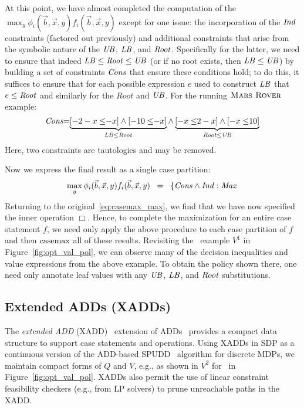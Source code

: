 At this point, we have almost completed the computation
of the $\max_y \phi_i(\vec{b},\vec{x},y) f_i(\vec{b},\vec{x},y)$
except for one issue: the incorporation of the $\mathit{Ind}$ constraints
(factored out previously) and additional constraints that arise from the
symbolic nature of the $\mathit{UB}$, $\mathit{LB}$, and $\mathit{Root}$.  Specifically
for the latter, we need to ensure that indeed $\mathit{LB} \leq \mathit{Root} \leq \mathit{UB}$
(or if no root exists, then $\mathit{LB} \leq \mathit{UB}$) by building a set
of constraints $\mathit{Cons}$ that ensure these conditions hold; to do this,
it suffices to ensure that for each possible expression $e$ used to
construct $\mathit{LB}$ that $e \leq \mathit{Root}$ and similarly for the $Root$ and $\mathit{UB}$.
For the running $\textsc{Mars Rover}$ example:
{\footnotesize 
\begin{equation*}
\mathit{Cons} \hspace{-1mm} = \hspace{-1mm} \underbrace{[-2 - x \leq \hspace{-1mm} -x] \land [-10 \leq \hspace{-1mm} -x]}_{\mathit{LB} \leq \mathit{Root}} \land \underbrace{[-x \leq \hspace{-1mm} 2 - x] \land [-x \leq \hspace{-1mm} 10]}_{\mathit{Root} \leq \mathit{UB}} 
\end{equation*}}
Here, two constraints are tautologies and may be removed.

Now we express the final result as a single case partition:
\begin{equation*}
\max_y \phi_i(\vec{b},\vec{x},y) f_i(\vec{b},\vec{x},y) \;\; = \;\;
\left\{ \mathit{Cons} \land \mathit{Ind}: \mathit{Max} \right.
\end{equation*}
Returning to the original~\eqref{eq:casemax_max}, we find that we have
now specified the inner operation $\Box$.  Hence, to complete the
maximization for an entire case statement $f$, we need only apply the
above procedure to each case partition of $f$ and then $\mathrm{casemax}$ all
of these results.  Revisiting the \MarsRover\ example $V^1$ in
Figure~\ref{fig:opt_val_pol}, we can observe many of the decision 
inequalities and value expressions from the above example.  To obtain
the policy shown there, one need only annotate leaf values with any 
$\mathit{UB}$, $\mathit{LB}$, and $\mathit{Root}$ substitutions.


\subsection{Extended ADDs (XADDs)}


The \emph{extended ADD} (XADD)~\cite{sanner_uai11} extension of
ADDs~\cite{bahar93add} provides a compact data structure to support
case statements and operations.  Using XADDs in SDP as a continuous
version of the ADD-based SPUDD~\cite{spudd} algorithm for
discrete MDPs, we maintain compact forms of $Q$ and $V$, e.g., as
shown in $V^2$ for \MarsRover\ in Figure~\ref{fig:opt_val_pol}.  XADDs
also permit the use of linear constraint feasibility checkers (e.g.,
from LP solvers) to prune unreachable paths in the XADD.

